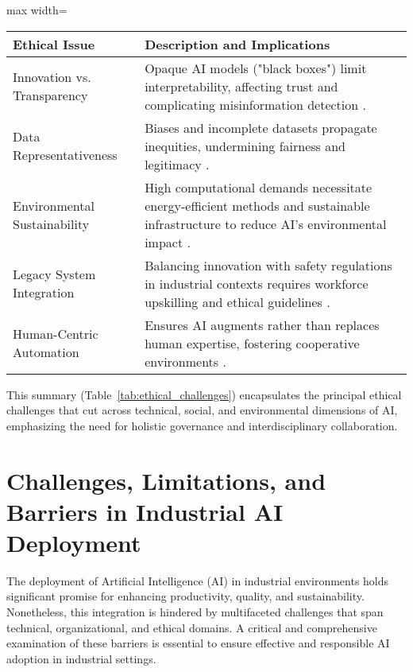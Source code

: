 \documentclass[sigconf]{acmart}
\begin{document}
\begin{table*}[htbp]
\centering
\caption{Summary of Key Cross-Cutting Ethical Challenges in AI Development and Deployment}
\label{tab:ethical_challenges}
\begin{adjustbox}{max width=\textwidth}
\begin{tabular}{ll}
\toprule
\textbf{Ethical Issue} & \textbf{Description and Implications} \\
\bottomrule
Innovation vs. Transparency & Opaque AI models ("black boxes") limit interpretability, affecting trust and complicating misinformation detection \cite{ref7,ref8}. \\
Data Representativeness & Biases and incomplete datasets propagate inequities, undermining fairness and legitimacy \cite{ref37,ref20}. \\
Environmental Sustainability & High computational demands necessitate energy-efficient methods and sustainable infrastructure to reduce AI's environmental impact \cite{ref19}. \\
Legacy System Integration & Balancing innovation with safety regulations in industrial contexts requires workforce upskilling and ethical guidelines \cite{ref11,ref12,ref38}. \\
Human-Centric Automation & Ensures AI augments rather than replaces human expertise, fostering cooperative environments \cite{ref2}. \\
\bottomrule
\end{tabular}
\end{adjustbox}
\end{table*}

This summary (Table~\ref{tab:ethical_challenges}) encapsulates the principal ethical challenges that cut across technical, social, and environmental dimensions of AI, emphasizing the need for holistic governance and interdisciplinary collaboration.

\section{Challenges, Limitations, and Barriers in Industrial AI Deployment}

The deployment of Artificial Intelligence (AI) in industrial environments holds significant promise for enhancing productivity, quality, and sustainability. Nonetheless, this integration is hindered by multifaceted challenges that span technical, organizational, and ethical domains. A critical and comprehensive examination of these barriers is essential to ensure effective and responsible AI adoption in industrial settings.
\end{document}
